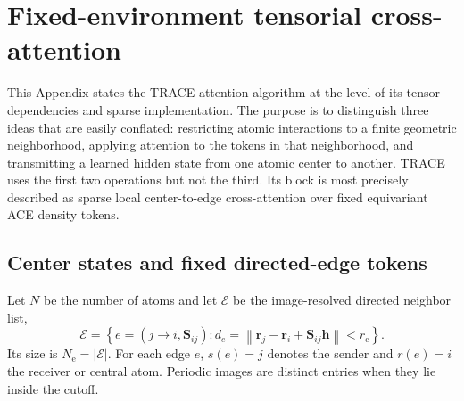 \documentclass[aps,prx,preprint,notitlepage,superscriptaddress,nofootinbib,floatfix]{revtex4-2}
\newcommand{\vect}[1]{\bm{#1}}
\newif\ifshowrevisions
\newenvironment{draftthirtyoneblock}
  {\ifshowrevisions\color{draftthirtyonecolor}\fi}
  {}
\begin{document}
\clearpage
\appendix
\begin{draftthirtyoneblock}

\section{Fixed-environment tensorial cross-attention}
\label{app:attention}

This Appendix states the TRACE attention algorithm at the level of its tensor
dependencies and sparse implementation. The purpose is to distinguish three
ideas that are easily conflated: restricting atomic interactions to a finite
geometric neighborhood, applying attention to the tokens in that
neighborhood, and transmitting a learned hidden state from one atomic center
to another. TRACE uses the first two operations but not the third. Its block
is most precisely described as sparse local center-to-edge cross-attention
over fixed equivariant ACE density tokens.

\subsection{Center states and fixed directed-edge tokens}

Let \(N\) be the number of atoms and let \(\mathcal E\) be the image-resolved
directed neighbor list,
\begin{equation}
 \mathcal E=
 \left\{e=(j\!\rightarrow\! i,\vect S_{ij}):
 d_e=\left\lVert\vect r_j-\vect r_i+\vect S_{ij}\vect h\right\rVert
 <r_{\mathrm c}\right\}.
 \label{eq:app-edge-set}
\end{equation}
Its size is \(N_{\mathrm e}=|\mathcal E|\). For each edge \(e\), \(s(e)=j\)
denotes the sender and \(r(e)=i\) the receiver or central atom. Periodic images
are distinct entries when they lie inside the cutoff.


\end{draftthirtyoneblock}
\end{document}

